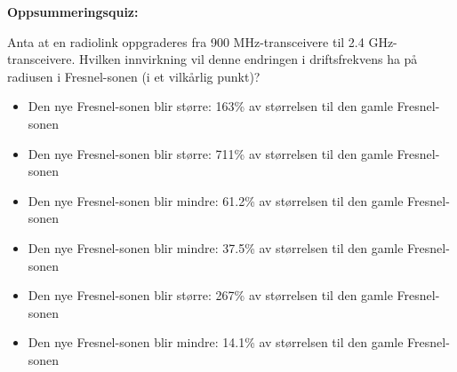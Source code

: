 \noindent
{\bf Oppsummeringsquiz:}

Anta at en radiolink oppgraderes fra 900 MHz-transceivere til 2.4 GHz-transceivere. Hvilken innvirkning vil denne endringen i driftsfrekvens ha på radiusen i Fresnel-sonen (i et vilkårlig punkt)?

\begin{itemize}
\item{} Den nye Fresnel-sonen blir større: 163\% av størrelsen til den gamle Fresnel-sonen
\vskip 5pt 
\item{} Den nye Fresnel-sonen blir større: 711\% av størrelsen til den gamle Fresnel-sonen 
\vskip 5pt 
\item{} Den nye Fresnel-sonen blir mindre: 61.2\% av størrelsen til den gamle Fresnel-sonen
\vskip 5pt 
\item{} Den nye Fresnel-sonen blir mindre: 37.5\% av størrelsen til den gamle Fresnel-sonen 
\vskip 5pt 
\item{} Den nye Fresnel-sonen blir større: 267\% av størrelsen til den gamle Fresnel-sonen 
\vskip 5pt 
\item{} Den nye Fresnel-sonen blir mindre: 14.1\% av størrelsen til den gamle Fresnel-sonen 
\end{itemize}



